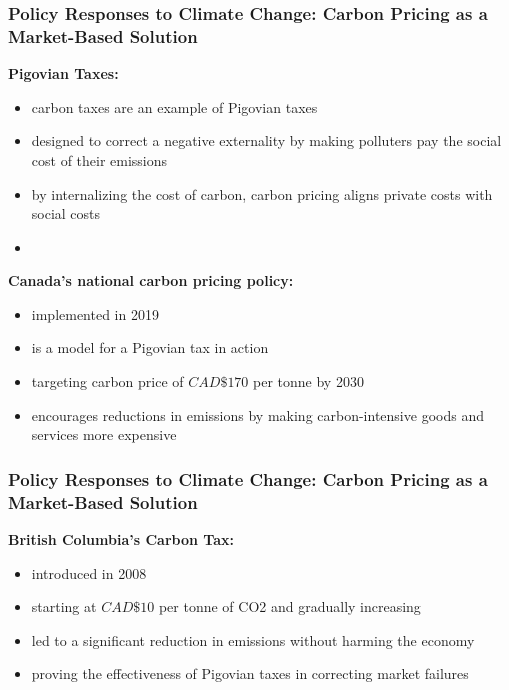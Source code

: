 \documentclass[blue]{beamer}
\begin{document}
 
 
        \begin{frame} \frametitle{Policy Responses to Climate Change: Carbon Pricing as a Market-Based Solution}
\label{Policy Responses to Climate Change: Carbon Pricing as a Market-Based Solution}
\textbf{Pigovian Taxes:}
\begin{itemize}
\item carbon taxes are an example of Pigovian taxes

\item designed to correct a negative externality by making polluters pay the social cost of their emissions

\item by internalizing the cost of carbon, carbon pricing aligns private costs with social costs
\item[]
\end{itemize}

\textbf{Canada's national carbon pricing policy:}

\begin{itemize}
\item implemented in 2019
\item is a model for a Pigovian tax in action
\item targeting carbon price of $CAD \$170$ per tonne by 2030
\item encourages reductions in emissions by making carbon-intensive goods and services more expensive
\end{itemize}
 \end{frame}
 
 
         \begin{frame} \frametitle{Policy Responses to Climate Change: Carbon Pricing as a Market-Based Solution}
\label{Policy Responses to Climate Change: Carbon Pricing as a Market-Based Solution}


\textbf{British Columbia's Carbon Tax:}

\begin{itemize}
\item introduced in 2008
\item starting at  $CAD \$10$ per tonne of CO2 and gradually increasing
\item led to a significant reduction in emissions without harming the economy
\item proving the effectiveness of Pigovian taxes in correcting market failures
\end{itemize}
 \end{frame}
 
\end{document}
